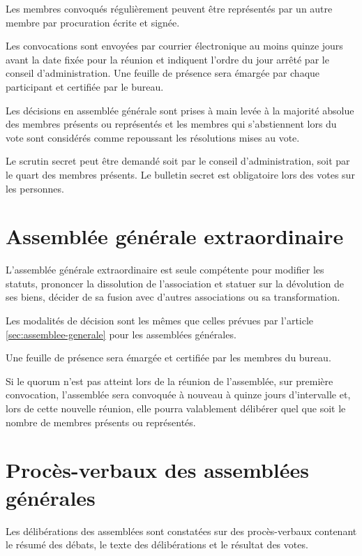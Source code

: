 \documentclass{article}
\begin{document}
Les membres convoqués régulièrement peuvent être représentés par un
autre membre par procuration écrite et signée.

Les convocations sont envoyées par courrier électronique au moins
quinze jours avant la date fixée pour la réunion et indiquent l'ordre
du jour arrêté par le conseil d'administration. Une feuille de
présence sera émargée par chaque participant et certifiée par le
bureau.

Les décisions en assemblée générale sont prises à main levée à la
majorité absolue des membres présents ou représentés et les
membres qui s'abstiennent lors du vote sont considérés comme
repoussant les résolutions mises au vote.

Le scrutin secret peut être demandé soit par le conseil
d'administration, soit par le quart des membres présents. Le bulletin
secret est obligatoire lors des votes sur les personnes.

\section{Assemblée générale extraordinaire}
\label{sec:assemblee-generale-extraordinaire}

L'assemblée générale extraordinaire est seule compétente pour modifier
les statuts, prononcer la dissolution de l'association et statuer sur
la dévolution de ses biens, décider de sa fusion avec d'autres
associations ou sa transformation.

Les modalités de décision sont les mêmes que celles prévues par
l'article \ref{sec:assemblee-generale} pour les assemblées générales.

Une feuille de présence sera émargée et certifiée par les membres du bureau.

Si le quorum n'est pas atteint lors de la réunion de l'assemblée, sur
première convocation, l'assemblée sera convoquée à nouveau à quinze
jours d'intervalle et, lors de cette nouvelle réunion, elle pourra
valablement délibérer quel que soit le nombre de membres présents ou
représentés.

\section{Procès-verbaux des assemblées générales}
\label{sec:proces-verbaux-des-assemblees-generales}

Les délibérations des assemblées sont constatées sur des
procès-verbaux contenant le résumé des débats, le texte des
délibérations et le résultat des votes.
\end{document}
